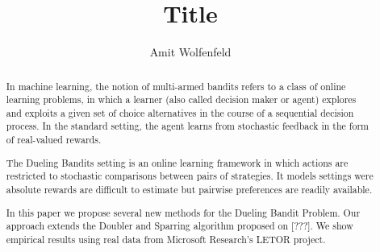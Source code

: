 \documentclass{llncs}
\author{Amit Wolfenfeld\inst{1}}
\institute{Technion}
\title{Title}
\begin{document}
\maketitle

\begin{abstract}
In machine learning, the notion of multi-armed bandits refers
to a class of online learning problems, in which a learner (also called decision maker or agent) explores and exploits a given set of choice alternatives in the course of a sequential decision process. 
In the standard setting, the agent learns from stochastic feedback in the form of real-valued rewards.

The Dueling Bandits setting is an online learning framework in which actions are restricted to stochastic comparisons between pairs of strategies.
It models settings were absolute rewards are difficult to estimate but pairwise preferences are readily available. 

In this paper we propose several new methods for the Dueling Bandit Problem. Our approach extends the Doubler and Sparring algorithm proposed on [???]. We show empirical results using real data from Microsoft Research's LETOR project.
\end{abstract}
\end{document}
